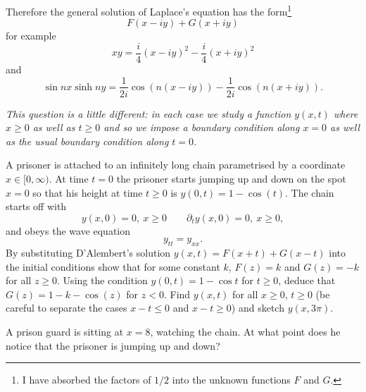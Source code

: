 \documentclass[12pt]{article}
\begin{document}
\begin{answer}
Therefore the general solution of Laplace's equation has the form\footnote{I have absorbed the factors of $1/2$ into the unknown functions $F$ and $G$.}
\[F(x-iy)+G(x+iy)\]
for example
\[xy=\frac{i}{4}(x-iy)^2-\frac{i}{4}(x+iy)^2\]
and
\[\sin nx\sinh ny=\frac{1}{2i}\cos(n(x-iy))-\frac{1}{2i}\cos(n(x+iy)).\]
\end{answer}
\newpage
\fi

\bigskip

\begin{question}
 {\em This question is a little different: in each case we study a function $y(x,t)$ where $x\geq 0$ as well as $t\geq 0$ and so we impose a boundary condition along $x=0$ as well as the usual boundary condition along $t=0$.}

A prisoner is attached to an infinitely long chain parametrised by a coordinate $x\in[0,\infty)$. At time $t=0$ the prisoner starts jumping up and down on the spot $x=0$ so that his height at time $t\geq 0$ is $y(0,t)=1-\cos(t)$. The chain starts off with
\[y(x,0)=0,\ x\geq 0\qquad\partial_ty(x,0)=0,\ x\geq 0,\]
and obeys the wave equation
\[y_{tt}=y_{xx}.\]
By substituting D'Alembert's solution $y(x,t)=F(x+t)+G(x-t)$ into the initial conditions show that for some constant $k$, $F(z)=k$ and $G(z)=-k$ for all $z\geq 0$. Using the condition $y(0,t)=1-\cos t$ for $t\geq 0$, deduce that $G(z)=1-k-\cos(z)$ for $z<0$. Find $y(x,t)$ for all $x\geq 0$, $t\geq 0$ (be careful to separate the cases $x-t\leq 0$ and $x-t\geq 0$) and sketch $y(x,3\pi)$.

A prison guard is sitting at $x=8$, watching the chain. At what point does he notice that the prisoner is jumping up and down?
\end{question}

\end{document}
